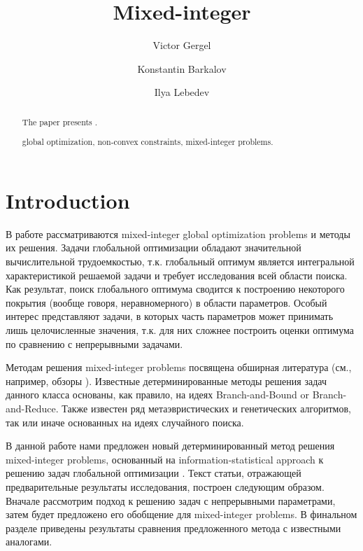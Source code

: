 \documentclass{llncs}
\begin{document}
\mainmatter 

\title{Mixed-integer}
\author{Victor Gergel \and Konstantin Barkalov \and Ilya Lebedev %
\\
}


\maketitle

\begin{abstract}
The paper presents .

\keywords global optimization, non-convex constraints, mixed-integer problems.

\end{abstract}

\section{Introduction}\label{sec:intro}
\Russian
В работе рассматриваются mixed-integer global optimization problems и методы их решения. Задачи глобальной оптимизации обладают значительной вычислительной трудоемкостью, т.к. глобальный оптимум является интегральной характеристикой решаемой задачи и требует исследования всей области поиска. Как результат, поиск глобального оптимума сводится к построению некоторого покрытия (вообще говоря, неравномерного) в области параметров. Особый интерес представляют задачи, в которых часть параметров может принимать лишь целочисленные значения, т.к. для них сложнее построить оценки оптимума по сравнению с непрерывными задачами.

Методам решения mixed-integer problems посвящена обширная литература (см., например, обзоры \cite{Burer,Boukouvala}). Известные детерминированные методы решения задач данного класса основаны, как правило, на идеях Branch-and-Bound or Branch-and-Reduce. Также известен ряд метаэвристических и генетических алгоритмов, так или иначе основанных на идеях случайного поиска.

В данной работе нами предложен новый детерминированный метод решения mixed-integer problems, основанный на information-statistical approach к решению задач глобальной оптимизации \cite{Strongin2000,Strongin2013}. Текст статьи, отражающей предварительные результаты исследования, построен следующим образом. Вначале рассмотрим подход к решению задач с непрерывными параметрами, затем будет предложено его обобщение для mixed-integer problems. В финальном разделе приведены результаты сравнения предложенного метода с известными аналогами.
\end{document}
